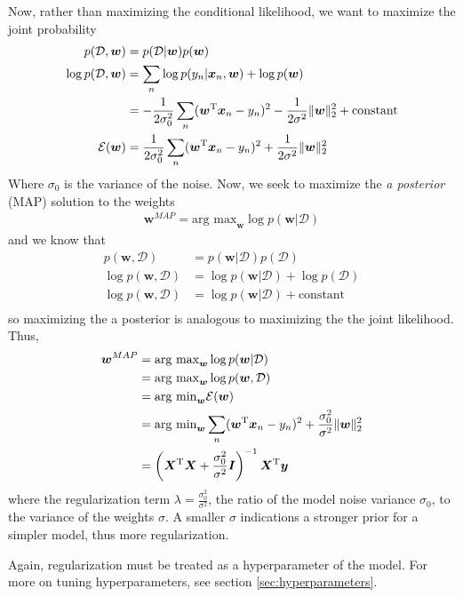 \documentclass[11pt]{article}
\newcommand{\vct}[1]{\boldsymbol{#1}} %
\newcommand{\mat}[1]{\boldsymbol{#1}} %
\newcommand{\T}{^{\textrm T}} %
\begin{document}
Now, rather than maximizing the conditional likelihood, we want to maximize the joint probability
\begin{align*}
p(\mathcal{D},\vct{w}) &= p(\mathcal{D}|\vct{w})p(\vct{w})\\
\log p(\mathcal{D},\vct{w}) &= \sum_n \log p(y_n|\vct{x}_n,\vct{w}) + \log p(\vct{w})\\
&= - \frac{1}{2\sigma_0^2} \sum_n (\vct{w}\T\vct{x}_n - y_n)^2 -  \frac{1}{2\sigma^2} \|\vct{w}\|_2^2 + \text{constant}\\
\mathcal{E}(\vct{w}) &= \frac{1}{2\sigma_0^2} \sum_n (\vct{w}\T\vct{x}_n - y_n)^2 +  \frac{1}{2\sigma^2} \|\vct{w}\|_2^2
\end{align*}
Where $\sigma_0$ is the variance of the noise. Now, we seek to maximize the {\it a posterior} (MAP) solution to the weights
\begin{align*}
\vct{w}^{MAP} = \text{arg max}_{\vct{w}} \log p(\vct{w}|\mathcal{D})
\end{align*}
and we know that 
\begin{align*}
p(\vct{w},\mathcal{D}) &= p(\vct{w}|\mathcal{D})p(\mathcal{D})\\
\log p(\vct{w},\mathcal{D}) &= \log p(\vct{w}|\mathcal{D})+ \log p(\mathcal{D})\\
\log p(\vct{w},\mathcal{D}) &= \log p(\vct{w}|\mathcal{D})+ \text{constant}\\
\end{align*}
so maximizing the a posterior is analogous to maximizing the the joint likelihood. Thus,
\begin{align*}
\vct{w}^{MAP} &= \text{arg max}_{\vct{w}} \log p(\vct{w}|\mathcal{D}) \\
&= \text{arg max}_{\vct{w}} \log p(\vct{w},\mathcal{D}) \\
&= \text{arg min}_{\vct{w}} \mathcal{E}(\vct{w}) \\
&= \text{arg min}_{\vct{w}} \sum_n (\vct{w}\T\vct{x}_n - y_n)^2 +  \frac{\sigma_0^2}{\sigma^2} \|\vct{w}\|_2^2\\
&= \left( \mat{X}\T\mat{X} + \frac{\sigma_0^2}{\sigma^2} \mat{I}\right)^{-1}\mat{X}\T\vct{y}
\end{align*}
where the regularization term $\lambda = \frac{\sigma_0^2}{\sigma^2}$, the ratio of the model noise variance $\sigma_0$, to the variance of the weights $\sigma$. A smaller $\sigma$ indications a stronger prior for a simpler model, thus more regularization.

Again, regularization must be treated as a hyperparameter of the model. For more on tuning hyperparameters, see section \ref{sec:hyperparameters}.
\end{document}
